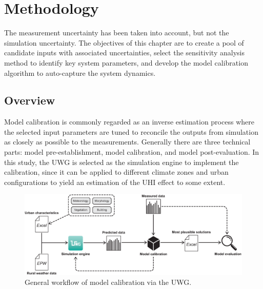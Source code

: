 \chapter{Methodology}

%

The measurement uncertainty has been taken into account, but not the simulation uncertainty. The objectives of this chapter are to create a pool of candidate inputs with associated uncertainties, select the sensitivity analysis method to identify key system parameters, and develop the model calibration algorithm to auto-capture the system dynamics.

\section{Overview}

Model calibration is commonly regarded as an inverse estimation process where the selected input parameters are tuned to reconcile the outputs from simulation as closely as possible to the measurements. Generally there are three technical parts: model pre-establishment, model calibration, and model post-evaluation. In this study, the UWG is selected as the simulation engine to implement the calibration, since it can be applied to different climate zones and urban configurations to yield an estimation of the UHI effect to some extent.

\begin{figure}
\centering
\includegraphics[width=.95\linewidth,trim=0 0 10 0,clip]{Figure4-1.eps}
\caption{General workflow of model calibration via the UWG.}
\end{figure}

